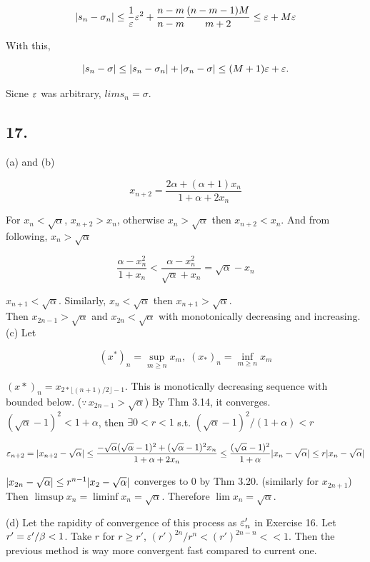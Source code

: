 \documentclass[11pt]{article}
\begin{document}
\[
\lvert s_n-\sigma_n\rvert \leq \frac{1}{\varepsilon}\varepsilon^2 + \frac{n-m}{n-m} \frac{(n-m-1)M}{m+2} \leq \varepsilon + M\varepsilon
\]

With this,

\[
\lvert s_n-\sigma\rvert \leq \lvert s_n-\sigma_n\rvert + \lvert\sigma_n-\sigma\rvert \leq (M+1)\varepsilon + \varepsilon.
\]

Sicne $\varepsilon$ was arbitrary, $lim s_n = \sigma$.

\subsection*{17.}


(a) and (b)

\[
x_{n+2}=\frac{2\alpha+(\alpha+1)x_n}{1+\alpha+2x_n}
\]

For $x_n < \sqrt{\alpha}$, $x_{n+2} > x_n$, otherwise $x_n > \sqrt{\alpha}$ then $x_{n+2} < x_n$. And from following, $x_n > \sqrt{\alpha}$

\[
\frac{\alpha-x_n^2}{1+x_n} < \frac{\alpha-x_n^2}{\sqrt{\alpha}+x_n} = \sqrt{\alpha}-x_n
\]

$x_{n+1} < \sqrt{\alpha}$. Similarly, $x_n < \sqrt{\alpha}$ then $x_{n+1} > \sqrt{\alpha}$.\\
Then $x_{2n-1}>\sqrt{\alpha}$ and $x_{2n}<\sqrt{\alpha}$ with monotonically decreasing and increasing.\\

(c) Let

\[
(x^*)_n = \sup_{m \geq n} x_m,\; (x_*)_n = \inf_{m \geq n} x_m
\]

$(x*)_n=x_{2*\lfloor{(n+1)/2}\rfloor-1}$. This is monotically decreasing sequence with bounded below. ($\because \, x_{2n-1}>\sqrt{\alpha}$) By Thm 3.14, it converges. $(\sqrt\alpha-1)^2<1+\alpha$, then $\exists 0<r<1$ s.t. $(\sqrt\alpha-1)^2/(1+\alpha)<r$

\[
\varepsilon_{n+2}=\lvert x_{n+2}- \sqrt{\alpha}\rvert \leq \frac{-\sqrt\alpha(\sqrt\alpha-1)^2+(\sqrt\alpha-1)^2x_n}{1+\alpha+2x_n}\leq \frac{(\sqrt\alpha-1)^2}{1+\alpha}\lvert x_n-\sqrt{\alpha}\rvert \leq r\lvert x_n-\sqrt\alpha\rvert
\]

$\lvert x_{2n}-\sqrt\alpha\rvert \leq r^{n-1} \lvert x_2-\sqrt\alpha\rvert$ converges to $0$ by Thm 3.20. (similarly for $x_{2n+1}$) Then $\limsup x_n=\liminf x_n=\sqrt\alpha$. Therefore $\lim x_n = \sqrt\alpha$.

(d) Let the rapidity of convergence of this process as $\varepsilon'_n$ in Exercise 16. Let $r' = \varepsilon'/\beta < 1$. Take $r$ for $r\geq r'$, $(r')^{2n}/r^n<(r')^{2n-n} << 1$. Then the previous method is way more convergent fast compared to current one.
\end{document}
